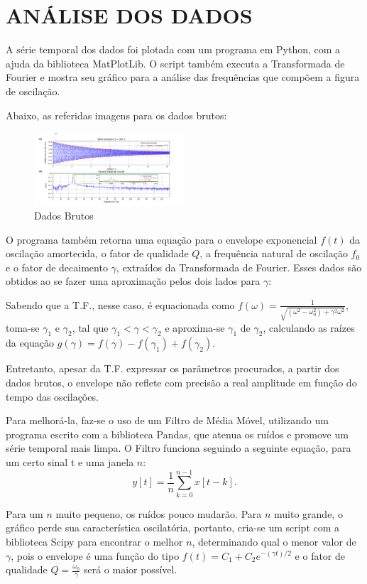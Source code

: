 \documentclass[10pt,a4paper,twocolumn]{article}
\begin{document}
\section{ANÁLISE DOS DADOS}
A série temporal dos dados foi plotada com um programa em Python, com a ajuda da biblioteca MatPlotLib. O script também executa a Transformada de Fourier e mostra seu gráfico para a análise das frequências que compõem a figura de oscilação. \par Abaixo, as referidas imagens para os dados brutos:
\begin{figure}[H]
\includegraphics[width=0.5\textwidth, left]{NãoFiltrado}
\caption{Dados Brutos}
\label{fig:naofiltrado}
\end{figure}
\par O programa também retorna uma equação para o envelope exponencial $f(t)$ da oscilação amortecida, o fator de qualidade $Q$, a frequência natural de oscilação $f_0$ e o fator de decaimento $\gamma$, extraídos da Transformada de Fourier. Esses dados são obtidos ao se fazer uma aproximação pelos dois lados para $\gamma$:
\par Sabendo que a T.F., nesse caso, é equacionada como $f(\omega)=\frac{1}{\sqrt{(\omega^2-\omega_0^2)+\gamma^2\omega^2}}$, toma-se $\gamma_1$ e $\gamma_2$, tal que $\gamma_1<\gamma<\gamma_2$ e aproxima-se $\gamma_1$ de $\gamma_2$, calculando as raízes da equação $g(\gamma)=f(\gamma)-f(\gamma_1)+f(\gamma_2)$.
\par Entretanto, apesar da T.F. expressar os parâmetros procurados, a partir dos dados brutos, o envelope não reflete com precisão a real amplitude em função do tempo das oscilações. 
\par Para melhorá-la, faz-se o uso de um Filtro de Média Móvel, utilizando um programa escrito com a biblioteca Pandas, que atenua os ruídos e promove um série temporal mais limpa. O Filtro funciona seguindo a seguinte equação, para um certo sinal t e uma janela $n$:
\begin{equation}
y[t]=\frac{1}{n}\sum_{k=0}^{n-1}x[t-k].
\end{equation}
\par Para um $n$ muito pequeno, os ruídos pouco mudarão. Para $n$ muito grande, o gráfico perde sua característica oscilatória, portanto, cria-se um script com a biblioteca Scipy para encontrar o melhor $n$, determinando qual o menor valor de $\gamma$, pois o envelope é uma função do tipo $f(t)=C_1 + C_2e^{-(\gamma t)/2}$ e o fator de qualidade $Q=\frac{\omega_0}{\gamma}$ será o maior possível. 
\end{document}
